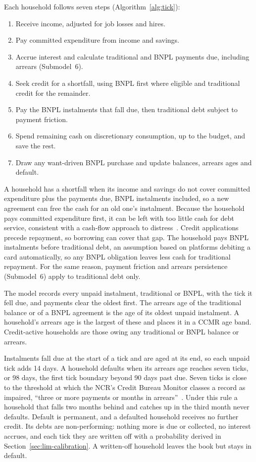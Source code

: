 Each household follows seven steps (Algorithm~\ref{alg:tick}):
\begin{enumerate}
    \item Receive income, adjusted for job losses and hires.
    \item Pay committed expenditure from income and savings.
    \item Accrue interest and calculate traditional and \ac{BNPL} payments due, including arrears (Submodel~6).
    \item Seek credit for a shortfall, using \ac{BNPL} first where eligible and traditional credit for the remainder.
    \item Pay the \ac{BNPL} instalments that fall due, then traditional debt subject to payment friction.
    \item Spend remaining cash on discretionary consumption, up to the budget, and save the rest.
    \item Draw any want-driven \ac{BNPL} purchase and update balances, arrears ages and default.
\end{enumerate}

A household has a shortfall when its income and savings do not cover committed expenditure
plus the payments due, \ac{BNPL} instalments included, so a new agreement can free the cash for
an old one's instalment. Because the household pays committed expenditure first, it can be left
with too little cash for debt service, consistent with a cash-flow approach to
distress~\citep{madeira2018chile}. Credit applications precede repayment, so borrowing can cover
that gap. The household pays \ac{BNPL} instalments before traditional debt, an assumption based on
platforms debiting a card automatically, so any \ac{BNPL}
obligation leaves less cash for traditional repayment. For the same reason, payment friction and arrears persistence (Submodel~6) apply
to traditional debt only.

The model records every unpaid instalment, traditional or \ac{BNPL}, with the tick it fell due,
and payments clear the oldest first. The arrears age of the traditional balance or of a \ac{BNPL}
agreement is the age of its oldest unpaid instalment. A household's arrears age is the largest of
these and places it in a \ac{CCMR} age band. Credit-active households are those
owing any traditional or \ac{BNPL} balance or arrears.

Instalments fall due at the start of a tick and are aged at its end, so each unpaid tick
adds 14 days. A household defaults when its arrears age reaches seven ticks, or 98 days, the first tick
boundary beyond 90 days past due. Seven ticks is close to the threshold at which the \ac{NCR}'s Credit Bureau
Monitor classes a record as impaired, ``three or more payments or months in
arrears''~\citep[p.~8]{ncr_cbm_2017}. Under this rule a household that falls two months behind
and catches up in the third month never defaults. Default is permanent, and a defaulted
household receives no further credit. Its debts are non-performing: nothing more is due or
collected, no interest accrues, and each tick they are written off with a probability derived in
Section~\ref{sec:lim-calibration}. A written-off household leaves the book but stays in default.

